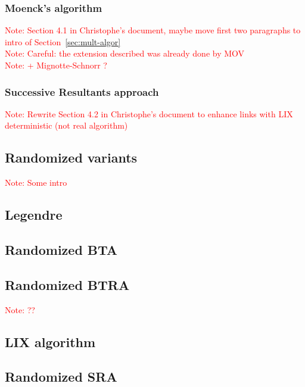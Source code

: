 \documentclass{article}
\newcounter{algo}
\newcommand{\Notes}[1]{\textcolor{red}{Note: #1}}
\begin{document}
\subsubsection{Moenck's algorithm}
\label{sec:Moenck}
\Notes{Section 4.1 in Christophe's document, maybe move first two paragraphs to intro of Section~\ref{sec:mult-algor}}\\
\noindent \Notes{Careful: the extension described was already done by MOV}\\
\noindent\Notes{+ Mignotte-Schnorr ?}

\subsubsection{Successive Resultants approach}
\label{sec:LIX}
\Notes{Rewrite Section 4.2 in Christophe's document to enhance links with LIX deterministic (not real algorithm)}



\subsection{Randomized variants}
\label{sec:randomized-variants}

\Notes{Some intro}

\subsection{Legendre}
\label{sec:legendre}

\subsection{Randomized BTA}
\label{sec:BTArand}

\subsection{Randomized BTRA}
\label{sec:BTRArand}
\Notes{??}

\subsection{LIX algorithm}
\label{sec:LIXrand}

\subsection{Randomized SRA}
\label{sec:SRArand}
\end{document}
